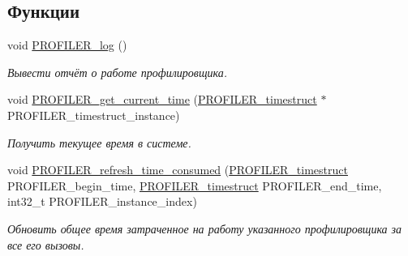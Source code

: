 \subsection*{Функции}
\begin{DoxyCompactItemize}
\item 
void \hyperlink{group___xD0_x9F_xD0_xBE_xD1_x80_xD1_x82_xD0_xB8_xD1_x80_xD1_x83_xD0_xB5_xD0_xBC_xD0_xB0_xD1_x8F_2ef1b31e26d7139e4bfe94879d1322e3_ga2f57ecff908155818a48144e366f7c57}{\-P\-R\-O\-F\-I\-L\-E\-R\-\_\-log} ()
\begin{DoxyCompactList}\small\item\em Вывести отчёт о работе профилировщика. \end{DoxyCompactList}\item 
void \hyperlink{group___xD0_x9F_xD0_xBE_xD1_x80_xD1_x82_xD0_xB8_xD1_x80_xD1_x83_xD0_xB5_xD0_xBC_xD0_xB0_xD1_x8F_2ef1b31e26d7139e4bfe94879d1322e3_ga106b837099d8b52043148fa42592608b}{\-P\-R\-O\-F\-I\-L\-E\-R\-\_\-get\-\_\-current\-\_\-time} (\hyperlink{group___xD0_x9F_xD0_xBE_xD1_x80_xD1_x82_xD0_xB8_xD1_x80_xD1_x83_xD0_xB5_xD0_xBC_xD0_xB0_xD1_x8F_2ef1b31e26d7139e4bfe94879d1322e3_gae02193769f3b21a09fc0d5035e566a75}{\-P\-R\-O\-F\-I\-L\-E\-R\-\_\-timestruct} $\ast$\-P\-R\-O\-F\-I\-L\-E\-R\-\_\-timestruct\-\_\-instance)
\begin{DoxyCompactList}\small\item\em Получить текущее время в системе. \end{DoxyCompactList}\item 
void \hyperlink{group___xD0_x9F_xD0_xBE_xD1_x80_xD1_x82_xD0_xB8_xD1_x80_xD1_x83_xD0_xB5_xD0_xBC_xD0_xB0_xD1_x8F_2ef1b31e26d7139e4bfe94879d1322e3_ga0072e0d84e203ad6499be54f4b6e14ee}{\-P\-R\-O\-F\-I\-L\-E\-R\-\_\-refresh\-\_\-time\-\_\-consumed} (\hyperlink{group___xD0_x9F_xD0_xBE_xD1_x80_xD1_x82_xD0_xB8_xD1_x80_xD1_x83_xD0_xB5_xD0_xBC_xD0_xB0_xD1_x8F_2ef1b31e26d7139e4bfe94879d1322e3_gae02193769f3b21a09fc0d5035e566a75}{\-P\-R\-O\-F\-I\-L\-E\-R\-\_\-timestruct} \-P\-R\-O\-F\-I\-L\-E\-R\-\_\-begin\-\_\-time, \hyperlink{group___xD0_x9F_xD0_xBE_xD1_x80_xD1_x82_xD0_xB8_xD1_x80_xD1_x83_xD0_xB5_xD0_xBC_xD0_xB0_xD1_x8F_2ef1b31e26d7139e4bfe94879d1322e3_gae02193769f3b21a09fc0d5035e566a75}{\-P\-R\-O\-F\-I\-L\-E\-R\-\_\-timestruct} \-P\-R\-O\-F\-I\-L\-E\-R\-\_\-end\-\_\-time, int32\-\_\-t \-P\-R\-O\-F\-I\-L\-E\-R\-\_\-instance\-\_\-index)
\begin{DoxyCompactList}\small\item\em Обновить общее время затраченное на работу указанного профилировщика за все его вызовы. \end{DoxyCompactList}\end{DoxyCompactItemize}


